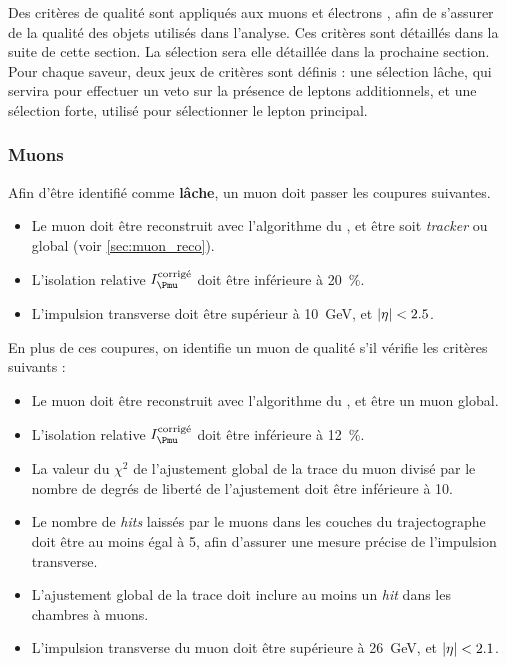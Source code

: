 \bigskip

Des critères de qualité sont appliqués aux muons et électrons \pf, afin de s'assurer de la qualité des objets utilisés dans l'analyse. Ces critères sont détaillés dans la suite de cette section. La sélection sera elle détaillée dans la prochaine section. Pour chaque saveur, deux jeux de critères sont définis : une sélection lâche, qui servira pour effectuer un veto sur la présence de leptons additionnels, et une sélection forte, utilisé pour sélectionner le lepton principal.

\subsubsection{Muons} \label{sec:sel_muon}

Afin d'être identifié comme \textbf{lâche}, un muon doit passer les coupures suivantes.
\begin{itemize}
    \item Le muon doit être reconstruit avec l'algorithme du \pf, et être soit \emph{tracker} ou global (voir \cref{sec:muon_reco}).
    \item L'isolation relative $I_{\Pmu}^\text{corrigé}$ doit être inférieure à \SI{20}{\%}.
    \item L'impulsion transverse doit être supérieur à \SI{10}{\GeV}, et $\lvert \eta \rvert < \num{2.5}$.
\end{itemize}

En plus de ces coupures, on identifie un muon de qualité s'il vérifie les critères suivants :
\begin{itemize}
  \item Le muon doit être reconstruit avec l'algorithme du \pf, et être un muon global.
  \item L'isolation relative $I_{\Pmu}^\text{corrigé}$ doit être inférieure à \SI{12}{\%}.
  \item La valeur du $\chi^2$ de l'ajustement global de la trace du muon divisé par le nombre de degrés de liberté de l'ajustement doit être inférieure à \num{10}.
  \item Le nombre de \emph{hits} laissés par le muons dans les couches du trajectographe doit être au moins égal à 5, afin d'assurer une mesure précise de l'impulsion transverse.
  \item L'ajustement global de la trace doit inclure au moins un \emph{hit} dans les chambres à muons.
  \item L'impulsion transverse du muon doit être supérieure à \SI{26}{\GeV}, et $\lvert \eta \rvert < \num{2.1}$.
\end{itemize}

